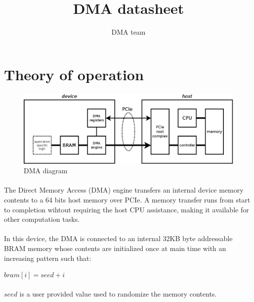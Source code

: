 \documentclass[a4paper, 11pt]{article}
\begin{document}
\title{DMA datasheet}
\author{DMA team}
\date{}

\maketitle

\newpage
\tableofcontents
{}


\newpage
\section{Theory of operation}

\begin{figure}[!h]
\begin{center}
\includegraphics[scale=0.25]{../pic/dma_theory/main.jpeg}
\end{center}
\caption{\tiny{DMA diagram}}
\label{dma_theory}
\end{figure}

\paragraph{}
The Direct Memory Access (DMA) engine transfers an internal device memory
contents to a 64 bits host memory over PCIe. A memory transfer runs from
start to completion wihtout requiring the host CPU assistance, making it
available for other computation tasks.
\paragraph{}
In this device, the DMA is connected to an internal 32KB byte addressable
BRAM memory whose contents are initialized once at main time with an
increasing  pattern such that:
\begin{center}$bram[i] = seed + i$\end{center}
\paragraph{}
$seed$ is a user provided value used to randomize the memory contents.
\end{document}
